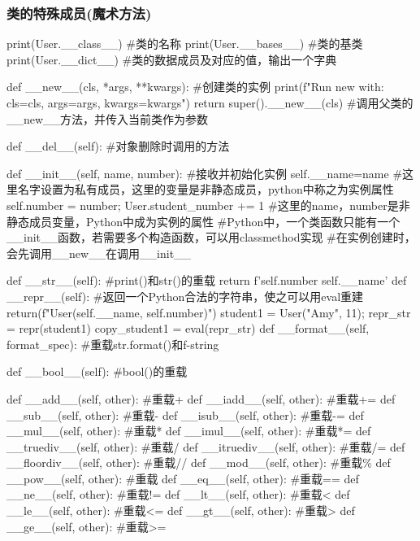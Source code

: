 \documentclass{article}
\begin{document}
      \subsubsection{类的特殊成员(魔术方法)}
        \begin{codeblock}[language=python, caption={Special members for class}]
          print(User.__class__) #类的名称
          print(User.__bases__) #类的基类
          print(User.__dict__) #类的数据成员及对应的值，输出一个字典

          def __new__(cls, *args, **kwargs): #创建类的实例
              print(f"Run new with: cls={cls}, args={args}, kwargs={kwargs}")
              return super().__new__(cls) #调用父类的\_\_new\_\_方法，并传入当前类作为参数

          def __del__(self): #对象删除时调用的方法

          def __init__(self, name, number): #接收并初始化实例
              self.__name=name #这里名字设置为私有成员，这里的变量是非静态成员，python中称之为实例属性
              self.number = number; 
              User.student_number += 1
              #这里的name，number是非静态成员变量，Python中成为实例的属性
              #Python中，一个类函数只能有一个\_\_init\_\_函数，若需要多个构造函数，可以用classmethod实现
          #在实例创建时，会先调用\_\_new\_\_在调用\_\_init\_\_

          def __str__(self): #print()和str()的重载
              return f'{self.number} {self.__name}'
          def __repr__(self): #返回一个Python合法的字符串，使之可以用eval重建
              return(f"User({self.__name}, {self.number})")
          student1 = User("Amy", 11); repr_str = repr(student1)
          copy_student1 = eval(repr_str)
          def __format__(self, format_spec): #重载str.format()和f-string

          def __bool__(self): #bool()的重载

          def __add__(self, other): #重载+
          def __iadd__(self, other): #重载+=
          def __sub__(self, other): #重载-
          def __isub__(self, other): #重载-=
          def __mul__(self, other): #重载*
          def __imul__(self, other): #重载*=
          def __truediv__(self, other): #重载/
          def __itruediv__(self, other): #重载/=
          def __floordiv__(self, other): #重载//
          def __mod__(self, other): #重载\%
          def __pow__(self, other): #重载\*\*
          def __eq__(self, other): #重载==
          def __ne__(self, other): #重载!=
          def __lt__(self, other): #重载<
          def __le__(self, other): #重载<=
          def __gt__(self, other): #重载>
          def __ge__(self, other): #重载>=


\end{codeblock}
\end{document}
